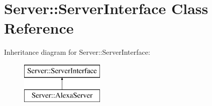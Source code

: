 \hypertarget{classServer_1_1ServerInterface}{}\section{Server\+:\+:Server\+Interface Class Reference}
\label{classServer_1_1ServerInterface}
Inheritance diagram for Server\+:\+:Server\+Interface\+:\begin{figure}[H]
\begin{center}
\leavevmode
\includegraphics[height=2.000000cm]{d3/de4/classServer_1_1ServerInterface}
\end{center}
\end{figure}
